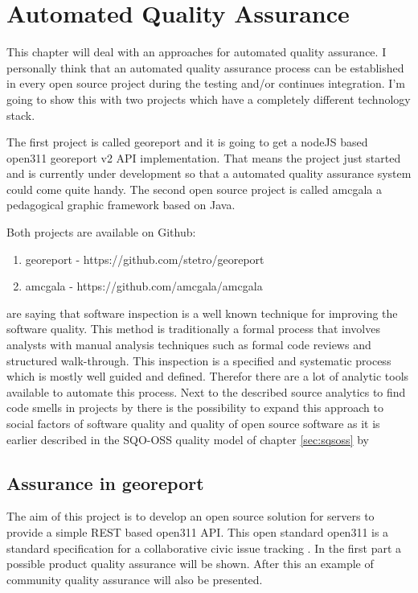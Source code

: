 \documentclass[DIV=calc,paper=a4,fontsize=9pt,twocolumn]{scrartcl}
\begin{document}
\section{Automated Quality Assurance}\label{sec:automated-quality-assurance}

This chapter will deal with an approaches for automated quality assurance. I personally think that an automated quality assurance process can be established in every open source project during the testing and/or continues integration. I'm going to show this with two projects which have a completely different technology stack. 

The first project is called georeport and it is going to get a nodeJS based open311 georeport v2 API implementation. That means the project just started and is currently under development so that a automated quality assurance system could come quite handy. The second open source project is called amcgala a pedagogical graphic framework based on Java.

Both projects are available on Github:

\begin{enumerate}
    \item georeport - https://github.com/stetro/georeport
    \item amcgala - https://github.com/amcgala/amcgala
\end{enumerate}

\citet{van2002java} are saying that software inspection is a well known technique for improving the software quality. This method is traditionally a formal process that involves analysts with manual analysis techniques such as formal code reviews and structured walk-through. This inspection is a specified and systematic process which is mostly well guided and defined. Therefor there are a lot of analytic tools available to automate this process. Next to the described source analytics to find code smells in projects by \citet{van2002java} there is the possibility to expand this approach to social factors of software quality and quality of open source software as it is earlier described in the SQO-OSS quality model of chapter \ref{sec:sqsoss} by \citet{samoladas2008sqo}

\subsection{Assurance in georeport}

The aim of this project is to develop an open source solution for servers to provide a simple REST based open311 API. This open standard open311 is a standard specification for a collaborative civic issue tracking \citep{open311}. In the first part a possible product quality assurance will be shown. After this an example of community quality assurance will also be presented.
\end{document}
